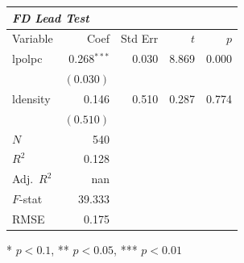 \renewcommand{\arraystretch}{1.1}
\setlength{\tabcolsep}{6pt}
\begin{table}[H]
\centering
\begin{tabular}{lrrrr}
\hline
\multicolumn{5}{l}{\textit{FD Lead Test}} \\
\hline
Variable & Coef & Std Err & $t$ & $p$ \\
\hline
lpolpc & 0.268$^{\ast\ast\ast}$ & 0.030 & 8.869 & 0.000 \\
 & $(0.030)$ & & & \\
ldensity & 0.146 & 0.510 & 0.287 & 0.774 \\
 & $(0.510)$ & & & \\
\hline
$N$ & 540 & & & \\
$R^2$ & 0.128 & & & \\
Adj.\ $R^2$ & nan & & & \\
$F$-stat & 39.333 & & & \\
RMSE & 0.175 & & & \\
\hline
\end{tabular}
\end{table}
\vspace{2pt}
\begin{flushleft}\footnotesize{* $p<0.1$, ** $p<0.05$, *** $p<0.01$}\end{flushleft}